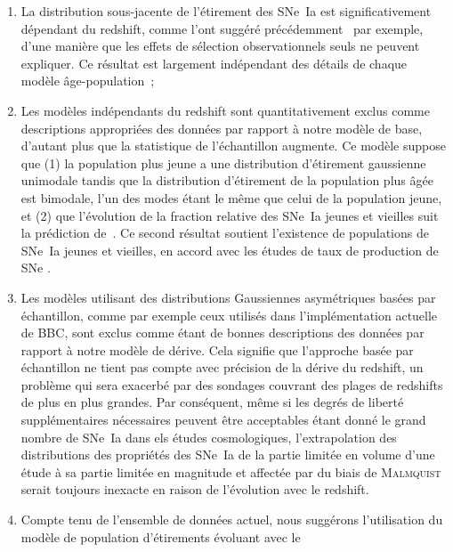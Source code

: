 \documentclass[../main/main.tex]{subfiles}
\begin{document}
\begin{enumerate}
    \item La distribution sous-jacente de l'étirement des SNe~Ia est
        significativement dépendant du redshift, comme l'ont suggéré
        précédemment~\cite{howell2007} par exemple, d'une manière que les effets
        de sélection observationnels seuls ne peuvent expliquer. Ce résultat est
        largement indépendant des détails de chaque modèle âge-population~;
    \item Les modèles indépendants du redshift sont quantitativement exclus
        comme descriptions appropriées des données par rapport à notre modèle de
        base, d'autant plus que la statistique de l'échantillon augmente. Ce
        modèle suppose que (1) la population plus jeune a une distribution
        d'étirement gaussienne unimodale tandis que la distribution d'étirement
        de la population plus âgée est bimodale, l'un des modes étant le même
        que celui de la population jeune, et (2) que l'évolution de la fraction
        relative des SNe~Ia jeunes et vieilles suit la prédiction
        de~\cite{rigault2020}. Ce second résultat soutient l'existence de
        populations de SNe~Ia jeunes et vieilles, en accord avec les études de
        taux de production de SNe \citep{mannucci2005, scannapieco2005,
        sullivan2006, aubourg2008}.
    \item Les modèles utilisant des distributions Gaussiennes asymétriques
        basées par échantillon, comme par exemple ceux utilisés dans
        l'implémentation actuelle de BBC, sont exclus comme étant de bonnes
        descriptions des données par rapport à notre modèle de dérive. Cela
        signifie que l'approche basée par échantillon ne tient pas compte avec
        précision de la dérive du redshift, un problème qui sera exacerbé par
        des sondages couvrant des plages de redshifts de plus en plus grandes.
        Par conséquent, même si les degrés de liberté supplémentaires
        nécessaires peuvent être acceptables étant donné le grand nombre de
        SNe~Ia dans els études cosmologiques, l'extrapolation des distributions
        des propriétés des SNe~Ia de la partie limitée en volume d'une
        étude à sa partie limitée en magnitude et affectée par du biais de
        \textsc{Malmquist} serait toujours inexacte en raison de l'évolution
        avec le redshift.
    \item Compte tenu de l'ensemble de données actuel, nous suggérons
        l'utilisation du modèle de population d'étirements évoluant avec le

\end{enumerate}
\end{document}

